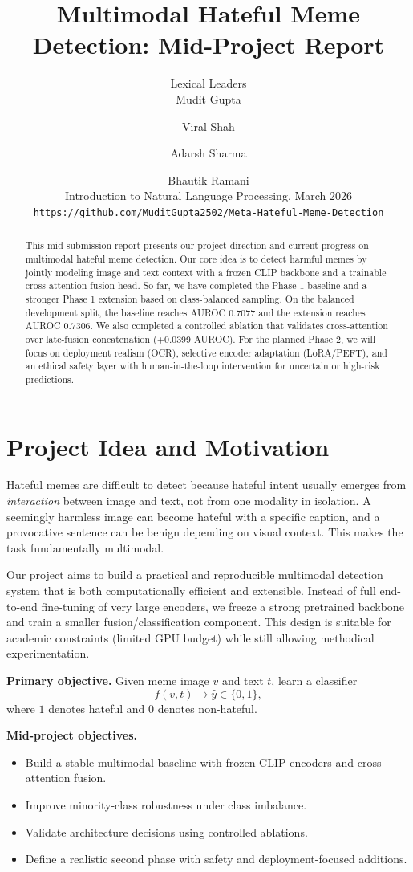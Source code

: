 \documentclass[11pt]{article}
\title{Multimodal Hateful Meme Detection: Mid-Project Report}
\author{Lexical Leaders \\
Mudit Gupta \and Viral Shah \and Adarsh Sharma \and Bhautik Ramani \\
Introduction to Natural Language Processing, March 2026 \\
\texttt{https://github.com/MuditGupta2502/Meta-Hateful-Meme-Detection}}
\begin{document}
\maketitle

\begin{abstract}
This mid-submission report presents our project direction and current progress on multimodal hateful meme detection. Our core idea is to detect harmful memes by jointly modeling image and text context with a frozen CLIP backbone and a trainable cross-attention fusion head. So far, we have completed the Phase 1 baseline and a stronger Phase 1 extension based on class-balanced sampling. On the balanced development split, the baseline reaches AUROC 0.7077 and the extension reaches AUROC 0.7306. We also completed a controlled ablation that validates cross-attention over late-fusion concatenation (+0.0399 AUROC). For the planned Phase 2, we will focus on deployment realism (OCR), selective encoder adaptation (LoRA/PEFT), and an ethical safety layer with human-in-the-loop intervention for uncertain or high-risk predictions.
\end{abstract}

\section{Project Idea and Motivation}
Hateful memes are difficult to detect because hateful intent usually emerges from \textit{interaction} between image and text, not from one modality in isolation. A seemingly harmless image can become hateful with a specific caption, and a provocative sentence can be benign depending on visual context. This makes the task fundamentally multimodal.

Our project aims to build a practical and reproducible multimodal detection system that is both computationally efficient and extensible. Instead of full end-to-end fine-tuning of very large encoders, we freeze a strong pretrained backbone and train a smaller fusion/classification component. This design is suitable for academic constraints (limited GPU budget) while still allowing methodical experimentation.

\textbf{Primary objective.}
Given meme image $v$ and text $t$, learn a classifier
\[
f(v,t) \rightarrow \hat{y} \in \{0,1\},
\]
where $1$ denotes hateful and $0$ denotes non-hateful.

\textbf{Mid-project objectives.}
\begin{itemize}[leftmargin=*,nosep]
  \item Build a stable multimodal baseline with frozen CLIP encoders and cross-attention fusion.
  \item Improve minority-class robustness under class imbalance.
  \item Validate architecture decisions using controlled ablations.
  \item Define a realistic second phase with safety and deployment-focused additions.
\end{itemize}
\end{document}
